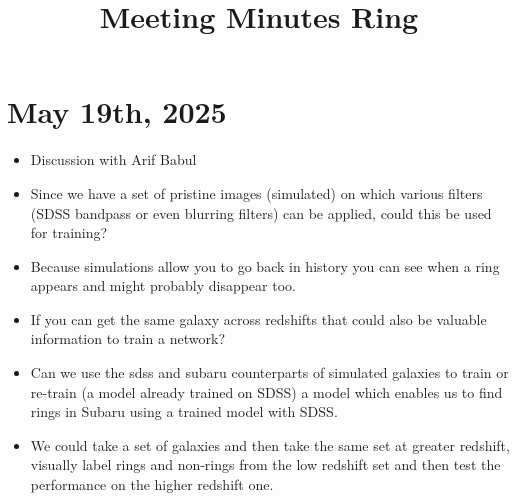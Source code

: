\documentclass{../template/texnote}
\title{Meeting Minutes Ring}
\begin{document}
    \maketitle {}
	\section{May 19th, 2025}
		\begin{itemize}
			\item Discussion with Arif Babul
			\item Since we have a set of pristine images (simulated) on which various filters (SDSS bandpass or even blurring filters) can be applied, could this be used for training?
			\item Because simulations allow you to go back in history you can see when a ring appears and might probably disappear too.
			\item If you can get the same galaxy across redshifts that could also be valuable information to train a network?
			\item Can we use the sdss and subaru counterparts of simulated galaxies to train or re-train (a model already trained on SDSS) a model which enables us to find rings in Subaru using a trained model with SDSS.
			\item We could take a set of galaxies and then take the same set at greater redshift, visually label rings and non-rings from the low redshift set and then test the performance on the higher redshift one.

		\end{itemize}
    \printbibliography
\end{document}
